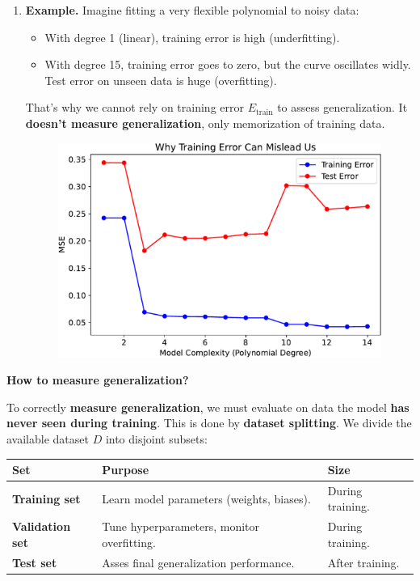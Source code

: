 \begin{enumerate}
    \item[\textcolor{Red2}{\faIcon{exclamation-triangle}}] \textcolor{Red2}{\textbf{Example.}} Imagine fitting a very flexible polynomial to noisy data:
    \begin{itemize}
        \item With degree 1 (linear), training error is high (underfitting).
        \item With degree 15, training error goes to zero, but the curve oscillates widly. Test error on unseen data is huge (overfitting).
    \end{itemize}
    That's why we cannot rely on training error $E_{\text{train}}$ to assess generalization. It \textbf{doesn't measure generalization}, only memorization of training data.
    \begin{figure}[!htp]
        \centering
        \includegraphics[width=.9\textwidth]{img/neural-networks-and-overfitting/measuring-generalization.pdf}
    \end{figure}
\end{enumerate}

\highspace
\begin{flushleft}
    \textcolor{Green3}{ \textbf{How to measure generalization?}}
\end{flushleft}
To correctly \textbf{measure generalization}, we must evaluate on data the model \textbf{has never seen during training}. This is done by \textbf{dataset splitting}. We divide the available dataset $D$ into disjoint subsets:

\begin{table}[!htp]
    \centering
    \begin{tabular}{@{} l | p{17em} | l @{}}
        \toprule
        Set & Purpose & Size \\
        \midrule
        \textbf{Training set}   & Learn model parameters (weights, biases).  & During training. \\[.3em]
        \textbf{Validation set} & Tune hyperparameters, monitor overfitting. & During training. \\[.3em]
        \textbf{Test set}       & Asses final generalization performance.    & After training. \\
        \bottomrule
    \end{tabular}
\end{table}

